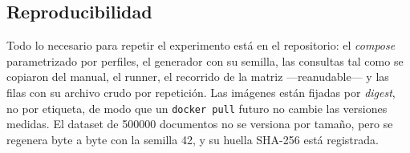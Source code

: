 \subsection{Reproducibilidad}

Todo lo necesario para repetir el experimento está en el repositorio: el
\emph{compose} parametrizado por perfiles, el generador con su semilla, las
consultas tal como se copiaron del manual, el runner, el recorrido de la matriz
—reanudable— y las \cifraFilasCsv{} filas con su archivo crudo por repetición. Las
imágenes están fijadas por \emph{digest}, no por etiqueta, de modo que un
\texttt{docker pull} futuro no cambie las versiones medidas. El dataset de
\num{500000} documentos no se versiona por tamaño, pero se regenera byte a byte con
la semilla 42, y su huella SHA-256 está registrada.
